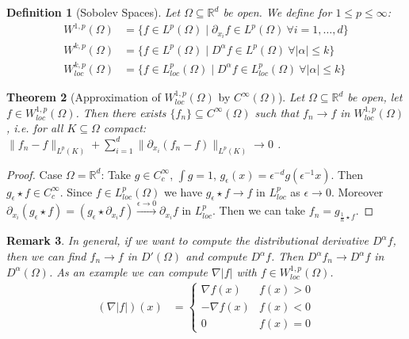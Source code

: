 \documentclass{report}
\theoremstyle{tommy}
\newtheorem{defn}{Definition}
\newtheorem{thm}[defn]{Theorem}
\newtheorem{rem}[defn]{Remark}
\begin{document}
  
  \begin{defn}[Sobolev Spaces]
    Let \(\Omega \subseteq \mathbb{R}^d\) be open. We define for \(1 \le p \le \infty\):
    \begin{align*}
      W^{1, p}(\Omega)
      &= \{f \in L^p(\Omega) \mid \partial_{x_i} f \in L^p(\Omega)\ \forall i=1, \dots, d \} \\
      W^{k, p}(\Omega)
      &= \{f \in L^p(\Omega) \mid D^\alpha f \in L^p(\Omega) \ \forall |\alpha|\le k \} \\
      W^{k, p}_{loc}(\Omega)
      &= \{f \in L_{loc}^p(\Omega) \mid D^\alpha f \in L_{loc}^p(\Omega) \ \forall |\alpha|\le k \}
    \end{align*}
  \end{defn}

  
  \begin{thm}[Approximation of \(W_{loc}^{1,p}(\Omega)\) by \(C^\infty(\Omega)\)]
    Let \(\Omega \subseteq \mathbb{R}^d\) be open, let \(f \in W_{loc}^{1,p}(\Omega)\). Then there exists \(\{f_n\} \subseteq C^\infty(\Omega)\) such that \(f_n \to f \) in \(W_{loc}^{1,p}(\Omega)\), i.e. for all \(K \subseteq \Omega\) compact: \(\|f_n - f\|_{L^p(K)} + \sum_{i=1}^d \| \partial_{x_i}(f_n - f)\|_{L^p(K)} \to 0\) .
  \end{thm}

  \begin{proof}
    Case \(\Omega = \mathbb{R}^d\): Take \(g \in C_c^\infty\), \(\int g = 1\), \(g_\epsilon(x) = \epsilon^{-d} g(\epsilon^{-1}x)\). Then \(g_\epsilon \star f \in C_c^\infty\). Since \(f \in L_{loc}^p(\Omega)\) we have \(g_\epsilon \star f \to f\) in \(L_{loc}^p\) as \(\epsilon \to 0\). Moreover \(\partial_{x_i} (g_\epsilon \star f) = (g_\epsilon \star \partial_{x_i} f)\xrightarrow{\epsilon \to 0} \partial_{x_i} f\) in \(L_{loc}^p\). Then we can take \(f_n = g_{\frac{1}{n} \star f}\).
  \end{proof}

  \begin{rem}
    In general, if we want to compute the distributional derivative \(D^\alpha f\), then we can find \(f_n \to f\) in \(D'(\Omega)\) and compute \(D^\alpha f\). Then \(D^\alpha f_n \to D^\alpha f\) in \(D^\alpha (\Omega)\). As an example we can compute \(\nabla |f|\) with \(f \in W_{loc}^{1,p}(\Omega)\).
    \begin{align*}
      (\nabla |f|)(x)
      &= \begin{cases}
        \nabla f(x) & f(x) > 0 \\
        - \nabla f(x) & f(x) < 0 \\
        0 & f(x) = 0
      \end{cases}
    \end{align*}
  \end{rem}
\end{document}
